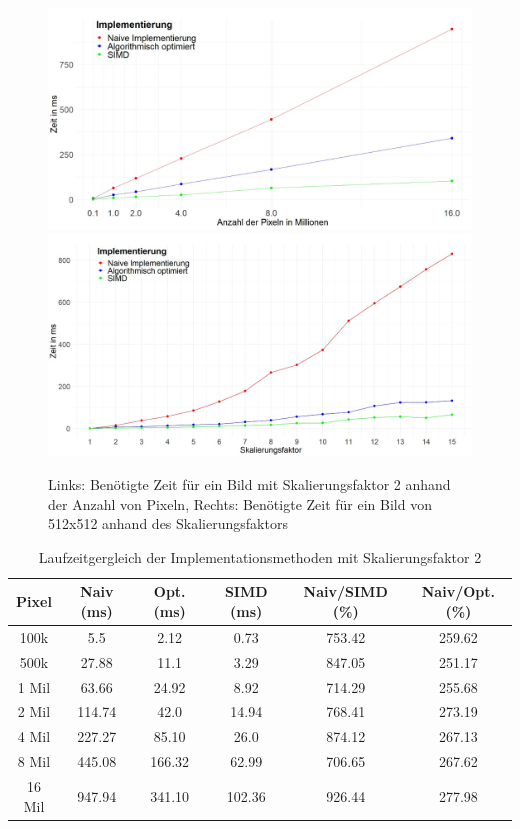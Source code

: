 \documentclass[course=erap]{aspdoc}
\begin{document}
\begin{figure}[ht]
    \centering
    \includegraphics[scale=0.125]{assets/speed.png}
    \includegraphics[scale=0.125]{assets/speed2.png}
    \caption{Links: Benötigte Zeit für ein Bild mit Skalierungsfaktor 2 anhand der Anzahl von Pixeln, Rechts: Benötigte Zeit für ein Bild von 512x512 anhand des Skalierungsfaktors}
    \label{fig:speed}
\end{figure}

\begin{table}[ht]
\centering
\begin{tabular}{|c|c|c|c|c|c|}
\hline
Pixel & Naiv (ms) & Opt. (ms) & SIMD (ms) & Naiv/SIMD (\%) & Naiv/Opt. (\%) \\ 
\hline
100k & 5.5 & 2.12 & 0.73 & 753.42 & 259.62 \\
500k & 27.88 & 11.1 & 3.29 & 847.05 & 251.17 \\
1 Mil & 63.66 & 24.92 & 8.92 & 714.29 & 255.68 \\
2 Mil & 114.74 & 42.0 & 14.94 & 768.41 & 273.19 \\
4 Mil & 227.27 & 85.10 & 26.0 & 874.12 & 267.13 \\
8 Mil & 445.08 & 166.32 & 62.99 & 706.65 & 267.62 \\
16 Mil & 947.94 & 341.10 & 102.36 & 926.44 & 277.98 \\
\hline
\end{tabular}
\caption{Laufzeitgergleich der Implementationsmethoden mit Skalierungsfaktor 2}
\label{table:comparison2}
\end{table}
\end{document}
